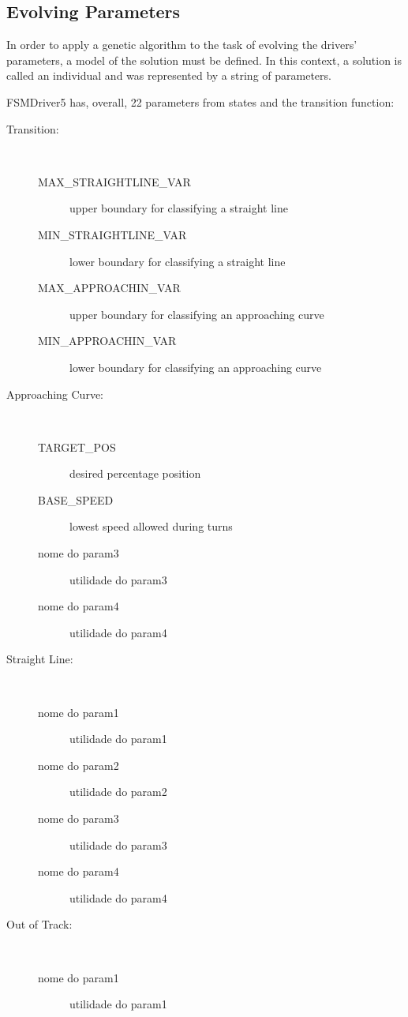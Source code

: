 \subsection{Evolving Parameters}%
In order to apply a genetic algorithm to the task of evolving the drivers' parameters, a model of the solution must be defined. In this context, a solution is called an individual and was represented by a string of parameters.

FSMDriver5 has, overall, 22 parameters from states and the transition function:

\begin{description}
	\item[Transition:] \ %
	\begin{description}
		\item[MAX\_STRAIGHTLINE\_VAR] upper boundary for classifying a straight line
		\item[MIN\_STRAIGHTLINE\_VAR] lower boundary for classifying a straight line
		\item[MAX\_APPROACHIN\_VAR] upper boundary for classifying an approaching curve
		\item[MIN\_APPROACHIN\_VAR] lower boundary for classifying an approaching curve
	\end{description}
	\item[Approaching Curve:] \ %
	\begin{description}
		\item[TARGET\_POS] desired percentage position
		\item[BASE\_SPEED] lowest speed allowed during turns
		\item[nome do param3] utilidade do param3
		\item[nome do param4] utilidade do param4
	\end{description}
	\item[Straight Line:] \ %
	\begin{description}
		\item[nome do param1] utilidade do param1
		\item[nome do param2] utilidade do param2
		\item[nome do param3] utilidade do param3
		\item[nome do param4] utilidade do param4
	\end{description}
	\item[Out of Track:] \ %
	\begin{description}
		\item[nome do param1] utilidade do param1

\end{description}
\end{description}
